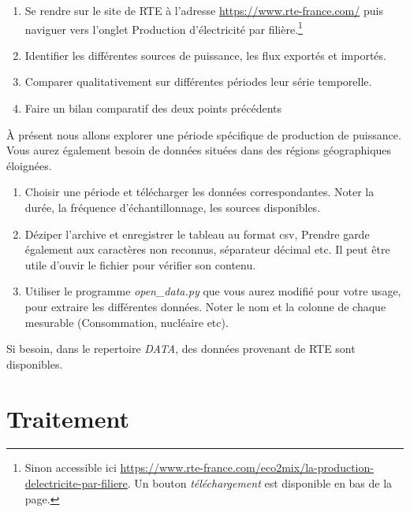 \documentclass[12pt,a4,french]{article}
\newcommand{\tmtextit}[1]{{\itshape{#1}}}
\begin{document}
\begin{enumerate}
  \item Se rendre sur le site de RTE à l'adresse 
  \href{https://www.rte-france.com/}{https://www.rte-france.com/} puis naviguer vers l'onglet Production d'électricité par filière.\footnote{Sinon accessible ici \href{https://www.rte-france.com/eco2mix/la-production-delectricite-par-filiere}{https://www.rte-france.com/eco2mix/la-production-delectricite-par-filiere}. Un bouton \textit{téléchargement} est disponible en bas de la page.}
  
  \item Identifier les différentes sources de puissance, les flux exportés et importés.
  
  \item  Comparer qualitativement sur différentes périodes leur série temporelle.
  
  \item Faire un bilan comparatif des deux points précédents
\end{enumerate}

À présent nous allons explorer une période spécifique de production de puissance. Vous aurez également besoin de données situées dans des régions géographiques éloignées.
  
\begin{enumerate}  
  \item Choisir une période et télécharger les données
  correspondantes. Noter la durée, la fréquence d'échantillonnage, les
  sources disponibles. 
  
  \item Déziper l'archive et enregistrer le
  tableau au format csv, Prendre garde également aux caractères non   reconnus, séparateur décimal etc. Il peut être utile d'ouvir le fichier pour vérifier son contenu.
  
  \item Utiliser le programme \tmtextit{open\_data.py} que vous aurez modifié
  pour votre usage, pour extraire les différentes données. Noter le nom et
  la colonne de chaque mesurable (Consommation, nucléaire etc). 
  
\end{enumerate}


Si besoin, dans le repertoire \tmtextit{DATA}, des données provenant de RTE sont
disponibles.


\part{Traitement}
\end{document}
